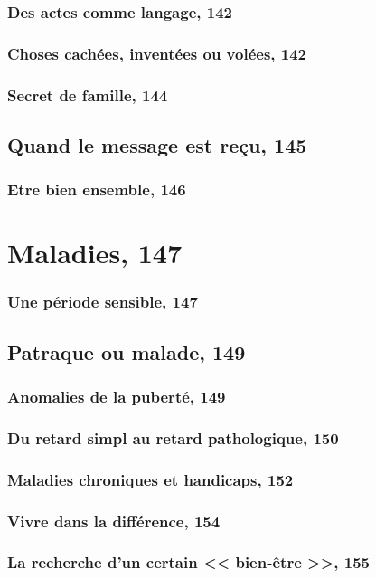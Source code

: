 \documentclass[12pt]{report}
\begin{document}
\begin{itemize}
\subsection{Des actes comme langage, 142}
\subsection{Choses cachées, inventées ou volées, 142}
\subsection{Secret de famille, 144}
\section{Quand le message est reçu, 145}
\subsection{Etre bien ensemble, 146}

\chapter{Maladies, 147}
\subsection{Une période sensible, 147}
\section{Patraque ou malade, 149}
\subsection{Anomalies de la puberté, 149}
\subsection{Du retard simpl au retard pathologique, 150}
\subsection{Maladies chroniques et handicaps, 152}
\subsection{Vivre dans la différence, 154}
\subsection{La recherche d'un certain << bien-être >>, 155}

\end{itemize}
\end{document}
